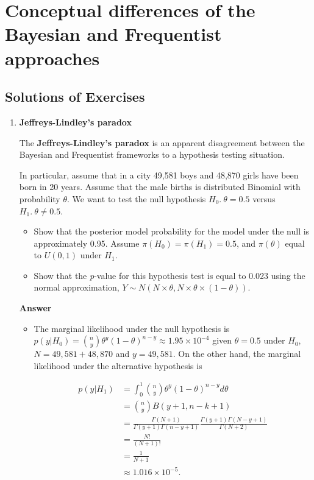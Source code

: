 \chapter{Conceptual differences of the Bayesian and Frequentist approaches}\label{chap2}
\section*{Solutions of Exercises}\label{sec21}
\begin{enumerate}[leftmargin=*]
\item \textbf{Jeffreys-Lindley's paradox}

The \textbf{Jeffreys-Lindley's paradox} \cite{Jeffreys1961,lindley1957statistical} is an apparent disagreement between the Bayesian and Frequentist frameworks to a hypothesis testing situation.

In particular, assume that in a city 49,581 boys and 48,870 girls have been born in 20 years. Assume that the male births is distributed Binomial with probability $\theta$. We want to test the null hypothesis $H_0. \ \theta=0.5$ versus $H_1. \ \theta\neq 0.5$.

\begin{itemize}
	\item Show that the posterior model probability for the model under the null is approximately 0.95. Assume $\pi(H_0)=\pi(H_1)=0.5$, and $\pi(\theta)$ equal to ${U}(0,1)$ under $H_1$.
	\item Show that the \textit{p}-value for this hypothesis test is equal to 0.023 using the normal approximation, $Y\sim {N}(N\times \theta, N\times \theta \times (1-\theta))$. 
\end{itemize}

\textbf{Answer}

\begin{itemize}
	\item The marginal likelihood under the null hypothesis is $p(y|H_0)={n \choose y}\theta^y(1-\theta)^{n-y}\approx 1.95\times 10^{-4}$ given $\theta=0.5$ under $H_0$, $N=49,581+48,870$ and $y=49,581$. On the other hand, the marginal likelihood under the alternative hypothesis is

\begin{align*}
	p(y|H_1)&=\int_{0}^{1}{n \choose y}\theta^y(1-\theta)^{n-y}d\theta\\
	&={n \choose y} B(y+1, n-k+1)\\
	&=\frac{\Gamma(N+1)}{\Gamma(y+1)\Gamma(n-y+1)}\frac{\Gamma(y+1)\Gamma(N-y+1)}{\Gamma(N+2)}\\
	&=\frac{N!}{(N+1)!}\\
	&=\frac{1}{N+1}\\
	&\approx1.016\times 10^{-5}. 
\end{align*}


\end{itemize}
\end{enumerate}
